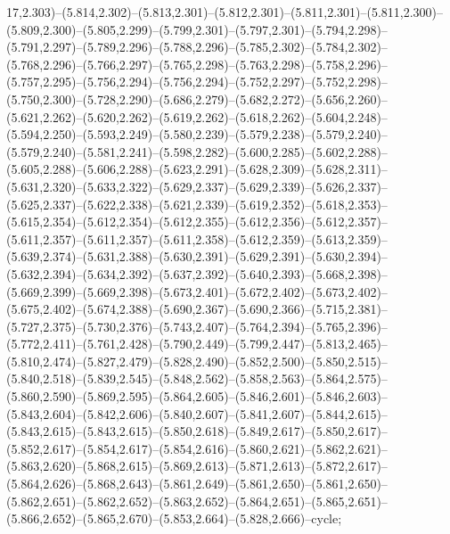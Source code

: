 17,2.303)--(5.814,2.302)--(5.813,2.301)--(5.812,2.301)--(5.811,2.301)--(5.811,2.300)--(5.809,2.300)--(5.805,2.299)--(5.799,2.301)--(5.797,2.301)--(5.794,2.298)--(5.791,2.297)--(5.789,2.296)--(5.788,2.296)--(5.785,2.302)--(5.784,2.302)--(5.768,2.296)--(5.766,2.297)--(5.765,2.298)--(5.763,2.298)--(5.758,2.296)--(5.757,2.295)--(5.756,2.294)--(5.756,2.294)--(5.752,2.297)--(5.752,2.298)--(5.750,2.300)--(5.728,2.290)--(5.686,2.279)--(5.682,2.272)--(5.656,2.260)--(5.621,2.262)--(5.620,2.262)--(5.619,2.262)--(5.618,2.262)--(5.604,2.248)--(5.594,2.250)--(5.593,2.249)--(5.580,2.239)--(5.579,2.238)--(5.579,2.240)--(5.579,2.240)--(5.581,2.241)--(5.598,2.282)--(5.600,2.285)--(5.602,2.288)--(5.605,2.288)--(5.606,2.288)--(5.623,2.291)--(5.628,2.309)--(5.628,2.311)--(5.631,2.320)--(5.633,2.322)--(5.629,2.337)--(5.629,2.339)--(5.626,2.337)--(5.625,2.337)--(5.622,2.338)--(5.621,2.339)--(5.619,2.352)--(5.618,2.353)--(5.615,2.354)--(5.612,2.354)--(5.612,2.355)--(5.612,2.356)--(5.612,2.357)--(5.611,2.357)--(5.611,2.357)--(5.611,2.358)--(5.612,2.359)--(5.613,2.359)--(5.639,2.374)--(5.631,2.388)--(5.630,2.391)--(5.629,2.391)--(5.630,2.394)--(5.632,2.394)--(5.634,2.392)--(5.637,2.392)--(5.640,2.393)--(5.668,2.398)--(5.669,2.399)--(5.669,2.398)--(5.673,2.401)--(5.672,2.402)--(5.673,2.402)--(5.675,2.402)--(5.674,2.388)--(5.690,2.367)--(5.690,2.366)--(5.715,2.381)--(5.727,2.375)--(5.730,2.376)--(5.743,2.407)--(5.764,2.394)--(5.765,2.396)--(5.772,2.411)--(5.761,2.428)--(5.790,2.449)--(5.799,2.447)--(5.813,2.465)--(5.810,2.474)--(5.827,2.479)--(5.828,2.490)--(5.852,2.500)--(5.850,2.515)--(5.840,2.518)--(5.839,2.545)--(5.848,2.562)--(5.858,2.563)--(5.864,2.575)--(5.860,2.590)--(5.869,2.595)--(5.864,2.605)--(5.846,2.601)--(5.846,2.603)--(5.843,2.604)--(5.842,2.606)--(5.840,2.607)--(5.841,2.607)--(5.844,2.615)--(5.843,2.615)--(5.843,2.615)--(5.850,2.618)--(5.849,2.617)--(5.850,2.617)--(5.852,2.617)--(5.854,2.617)--(5.854,2.616)--(5.860,2.621)--(5.862,2.621)--(5.863,2.620)--(5.868,2.615)--(5.869,2.613)--(5.871,2.613)--(5.872,2.617)--(5.864,2.626)--(5.868,2.643)--(5.861,2.649)--(5.861,2.650)--(5.861,2.650)--(5.862,2.651)--(5.862,2.652)--(5.863,2.652)--(5.864,2.651)--(5.865,2.651)--(5.866,2.652)--(5.865,2.670)--(5.853,2.664)--(5.828,2.666)--cycle;
